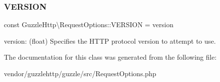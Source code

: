 \subsubsection{\texorpdfstring{V\+E\+R\+S\+I\+ON}{VERSION}}
{\footnotesize\ttfamily const Guzzle\+Http\textbackslash{}\+Request\+Options\+::\+V\+E\+R\+S\+I\+ON = \textquotesingle{}version\textquotesingle{}}

version\+: (float) Specifies the H\+T\+TP protocol version to attempt to use. 

The documentation for this class was generated from the following file\+:\begin{DoxyCompactItemize}
\item 
vendor/guzzlehttp/guzzle/src/Request\+Options.\+php\end{DoxyCompactItemize}
